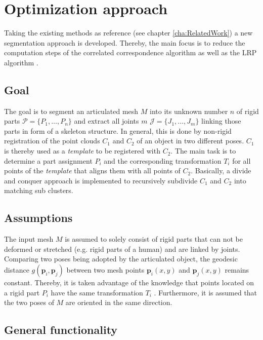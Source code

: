 \chapter{Optimization approach}
\label{cha:TheThesis}

Taking the existing methods as reference (see chapter \ref{cha:RelatedWork}) a new segmentation approach is developed. Thereby, the main focus is to reduce the computation steps of the correlated correspondence algorithm \cite{CorrelatedCorrespondance} as well as the LRP algorithm \cite {guo2016correspondence}.

\section{Goal}

The goal is to segment an articulated mesh $M$ into its unknown number $n$ of rigid parts $\mathcal{P} =  \{P_1,\ldots,P_n\}$ and extract all joints $m$ $\mathcal{J} =  \{J_1,\ldots,J_m\}$ linking those parts in form of a skeleton structure. In general, this is done by non-rigid registration of the point clouds $C_1$ and $C_2$ of an object in two different poses. $C_1$ is thereby used as a \textit{template} to be registered with $C_2$. The main task is to determine a part assignment $P_i$ and the corresponding transformation $T_i$ for all points of the \textit{template} that aligns them with all points of $C_2$. Basically, a divide and conquer approach is implemented to recursively subdivide $C_1$ and $C_2$ into matching sub clusters. 

\section{Assumptions}

The input mesh $M$ is assumed to solely consist of rigid parts that can not be deformed or stretched (e.g. rigid parts of a human) and are linked by joints. Comparing two poses being adopted by the articulated object, the geodesic distance $g(\boldsymbol{p}_i,\boldsymbol{p}_j)$ between two mesh points $\boldsymbol{p}_i(x,y)$ and $\boldsymbol{p}_j(x,y)$ remains constant. Thereby, it is taken advantage of the knowledge that points located on a rigid part $P_i$ have the same transformation $T_i$ . Furthermore, it is assumed that the two poses of $M$ are oriented in the same direction.

\section{General functionality}

